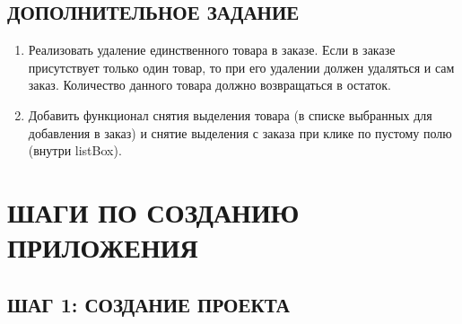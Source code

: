 \documentclass[12pt]{article}
\renewcommand{\texttt}[1]{{\small\ttfamily #1}}
\numberwithin{listing}{section}
\numberwithin{figure}{section}
\begin{document}
\subsection
[ДОПОЛНИТЕЛЬНОЕ ЗАДАНИЕ~\texorpdfstring{\faLightbulb}{}]
{ДОПОЛНИТЕЛЬНОЕ ЗАДАНИЕ~\texorpdfstring{\faLightbulb}{}\protect\footnotemark}

\begin{enumerate}
	\item[\faTrash] Реализовать удаление единственного товара в заказе. Если в заказе присутствует только один товар, то при его удалении должен удаляться и сам заказ. Количество данного товара должно возвращаться в остаток.

	\item[\faBroom] Добавить функционал снятия выделения товара (в списке выбранных для добавления в заказ) и снятие выделения с заказа при клике по пустому полю (внутри \texttt{listBox}).

\end{enumerate}


\newpage

\section{ШАГИ ПО СОЗДАНИЮ ПРИЛОЖЕНИЯ ~\texorpdfstring{\faRoute}{}}

\subsection{ШАГ 1: СОЗДАНИЕ ПРОЕКТА}
\end{document}
